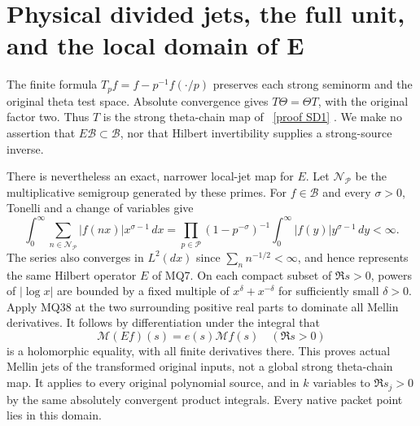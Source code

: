 \documentclass[11pt]{article}
\newcommand{\M}{\mathcal M}
\newcommand{\B}{\mathscr B}
\begin{document}
\section{Physical divided jets, the full unit, and the local domain of E}
The finite formula $T_pf=f-p^{-1}f(\cdot/p)$ preserves each
strong seminorm and the original theta test space. Absolute
convergence gives $T\Theta=\Theta T$, with the original factor
two. Thus $T$ is the strong theta-chain map of \cite{SD}%
~\href{https://github.com/KokunoYumeto/zeta-function-research-reader/blob/5992ad50c0f2a06921f1fcaded7b4e38097c0739/workbenches/splitzero-tandem/continuations/20260920-original-kernel-mixed-determinants/providers/SEMILOCAL_DUAL_THETA_TRANSFER.tex\#L27}{[proof SD1]}%
{}.
We make no assertion that $E\B\subset\B$, nor that Hilbert
invertibility supplies a strong-source inverse.

There is nevertheless an exact, narrower local-jet map for $E$.
Let $\mathcal N_{\mathcal P}$ be the multiplicative semigroup
generated by these primes. For $f\in\B$ and every $\sigma>0$,
Tonelli and a change of variables give
\[
 \int_0^\infty\sum_{n\in\mathcal N_{\mathcal P}}
 |f(nx)|x^{\sigma-1}\,dx
 =\prod_{p\in\mathcal P}(1-p^{-\sigma})^{-1}
       \int_0^\infty|f(y)|y^{\sigma-1}\,dy<\infty.           \tag{MQ38}
\]
The series also converges in $L^2(dx)$ since
$\sum_n n^{-1/2}<\infty$, and hence represents the same Hilbert
operator $E$ of MQ7. On each compact subset of $\Re s>0$, powers
of $|\log x|$ are bounded by a fixed multiple of
$x^\delta+x^{-\delta}$ for sufficiently small $\delta>0$.
Apply MQ38 at the two surrounding positive real parts to dominate
all Mellin derivatives. It follows by differentiation under the
integral that
\[
 \M(Ef)(s)=e(s)\M f(s)\quad(\Re s>0)                      \tag{MQ39}
\]
is a holomorphic equality, with all finite derivatives there. This
proves actual Mellin jets of the transformed original inputs,
not a global strong theta-chain map. It applies to every original
polynomial source, and in $k$ variables to $\Re s_j>0$ by the
same absolutely convergent product integrals. Every native packet
point lies in this domain.
\end{document}
